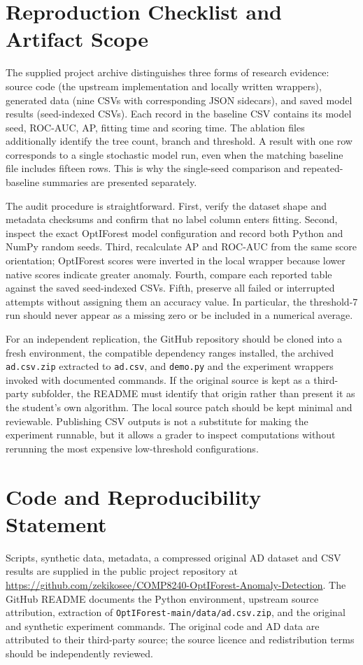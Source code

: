\documentclass[11pt]{article}
\newcommand{\repository}{\url{https://github.com/zekikosee/COMP8240-OptIForest-Anomaly-Detection}}
\begin{document}
\section{Reproduction Checklist and Artifact Scope}
The supplied project archive distinguishes three forms of research evidence: source code (the upstream implementation and locally written wrappers), generated data (nine CSVs with corresponding JSON sidecars), and saved model results (seed-indexed CSVs). Each record in the baseline CSV contains its model seed, ROC-AUC, AP, fitting time and scoring time. The ablation files additionally identify the tree count, branch and threshold. A result with one row corresponds to a single stochastic model run, even when the matching baseline file includes fifteen rows. This is why the single-seed comparison and repeated-baseline summaries are presented separately.
 
The audit procedure is straightforward. First, verify the dataset shape and metadata checksums and confirm that no label column enters fitting. Second, inspect the exact OptIForest model configuration and record both Python and NumPy random seeds. Third, recalculate AP and ROC-AUC from the same score orientation; OptIForest scores were inverted in the local wrapper because lower native scores indicate greater anomaly. Fourth, compare each reported table against the saved seed-indexed CSVs. Fifth, preserve all failed or interrupted attempts without assigning them an accuracy value. In particular, the threshold-7 run should never appear as a missing zero or be included in a numerical average.
 
For an independent replication, the GitHub repository should be cloned into a fresh environment, the compatible dependency ranges installed, the archived \texttt{ad.csv.zip} extracted to \texttt{ad.csv}, and \texttt{demo.py} and the experiment wrappers invoked with documented commands. If the original source is kept as a third-party subfolder, the README must identify that origin rather than present it as the student's own algorithm. The local source patch should be kept minimal and reviewable. Publishing CSV outputs is not a substitute for making the experiment runnable, but it allows a grader to inspect computations without rerunning the most expensive low-threshold configurations.
 
\section*{Code and Reproducibility Statement}
Scripts, synthetic data, metadata, a compressed original AD dataset and CSV results are supplied in the public project repository at \repository. The GitHub README documents the Python environment, upstream source attribution, extraction of \texttt{OptIForest-main/data/ad.csv.zip}, and the original and synthetic experiment commands. The original code and AD data are attributed to their third-party source; the source licence and redistribution terms should be independently reviewed.
 

\end{document}
